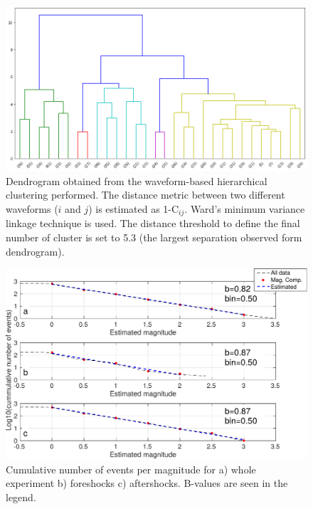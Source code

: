 \documentclass[a4paper,12pt]{article}
\begin{document}
\begin{figure}
\renewcommand{\thefigure}{S\arabic{figure}}
\begin{center}
 \noindent\includegraphics[width=1\linewidth]{dendrogram_balsorano.png} 
\end{center}
\caption{Dendrogram obtained from the waveform-based hierarchical clustering performed. The distance metric between two different waveforms ($i$ and $j$) is estimated as 1-C$_{ij}$. Ward's minimum variance linkage technique is used. The distance threshold to define the final number of cluster is set to 5.3 (the largest separation observed form dendrogram).}
\label{fig:dendrogram}
\end{figure}

\begin{figure}
\renewcommand{\thefigure}{S\arabic{figure}}
\begin{center}
 \noindent\includegraphics[width=1\linewidth]{b_value.pdf} 
\end{center}
\caption{Cumulative number of events per magnitude for a) whole experiment b) foreshocks c) aftershocks. B-values are seen in the legend.}
\label{fig:b_values}
\end{figure}
\end{document}
